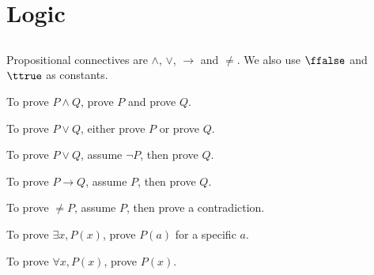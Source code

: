 \chapter{Logic}

\begin{goals}
\end{goals}

\section{}


Propositional connectives are $\wedge$, $\vee$, $\to$ and $\neq$. We also use $\ffalse$ and $\ttrue$ as constants. 


To prove $P\wedge Q$, prove $P$ and prove $Q$. 

To prove $P\vee Q$, either prove $P$ or prove $Q$.

To prove $P\vee Q$, assume $\neg P$, then prove $Q$.

To prove $P\to Q$, assume $P$, then prove $Q$.

To prove $\neq P$, assume $P$, then prove a contradiction.

To prove $\exists x, P(x)$, prove $P(a)$ for a specific $a$.

To prove $\forall x,P(x)$, prove $P(x)$. 